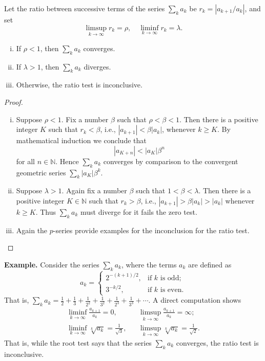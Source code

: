 \documentclass[11pt]{article}
\begin{document}
\begin{thm}
  Let the ratio between successive terms of the series $\sum_k a_k$ be $r_k = | a_{k+1} / a_k |$, and set
  \[
    \limsup_{k\to\infty} r_k = \rho, \quad
    \liminf_{k\to\infty} r_k = \lambda.
  \]
  \begin{enumerate}[(i)]
    \item If $\rho < 1$, then $\sum_k a_k$ converges.

    \item If $\lambda > 1$, then $\sum_k a_k$ diverges.

    \item Otherwise, the ratio test is inconclusive.
  \end{enumerate}
\end{thm}

\begin{proof}
  \begin{enumerate}[(i)]
    \item Suppose $\rho < 1$.  Fix a number $\beta$ such that $\rho < \beta < 1$.  Then there is a positive integer $K$ such that $r_k < \beta$, i.e., $|a_{k+1}| < \beta |a_k|$, whenever $k \geqslant K$.
      By mathematical induction we conclude that
     \[
       |a_{K+n}| < |a_K| \beta^n
     \]
     for all $n \in \mathbb{N}$.  Hence $\sum_k a_k$ converges by comparison to the convergent geometric series $\sum_k |a_K| \beta^k$.

   \item Suppose $\lambda > 1$.  Again fix a number $\beta$ such that $1 < \beta < \lambda$.  Then there is a positive integer $K \in \mathbb{N}$ such that $r_k > \beta$, i.e., $|a_{k+1}| > \beta |a_k| > |a_k|$ whenever $k \geqslant K$.  Thus $\sum_k a_k$ must diverge for it fails the zero test.

   \item Again the $p$-series provide examples for the inconclusion for the ratio test.
  \end{enumerate}
\end{proof}

\noindent\textbf{Example.}
    Consider the series $\sum_k a_k$, where the terms $a_k$ are defined as
    \[
      a_k = \begin{cases}
        2^{-(k+1)/2}, & \text{if $k$ is odd}; \\
        3^{-k/2},     & \text{if $k$ is even}.
    \end{cases}
    \]
    That is, $\sum_k a_k = \frac12 + \frac13 + \frac1{2^2} + \frac1{3^2} + \frac1{2^3} + \frac1{3^3} + \cdots$.
    A direct computation shows
    \begin{align*}
      \liminf_{k\to\infty} \frac{a_{k+1}}{a_k} = 0, & & \limsup_{k\to\infty} \frac{a_{k+1}}{a_k} = \infty; \\
      \liminf_{k\to\infty} \sqrt[k]{a_k} = \frac{1}{\sqrt{3}}, & & \limsup_{k\to\infty} \sqrt[k]{a_k} = \frac{1}{\sqrt{2}}.
    \end{align*}
    That is, while the root test says that the series $\sum_k a_k$ converges, the ratio test is inconclusive.
\end{document}
